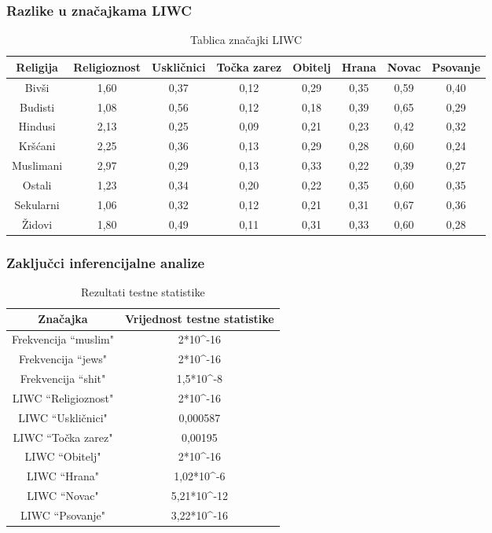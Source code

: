 \documentclass{beamer}
\begin{document}
\begin{frame}
\frametitle{Razlike u značajkama LIWC}
\begin{table}[h!]
\small
\setlength{\tabcolsep}{2pt}
\centering
\caption{Tablica značajki LIWC}
\label{table:liwc}
\begin{tabular}{@{}cccccccc@{}}
\hline
Religija  & Religioznost & Uskličnici & Točka zarez & Obitelj & Hrana & Novac & Psovanje \\
\hline
\hline
Bivši     & 1,60         & 0,37       & 0,12        & 0,29    & 0,35  & 0,59  & 0,40     \\
Budisti   & 1,08         & 0,56       & 0,12        & 0,18    & 0,39  & 0,65  & 0,29     \\
Hindusi   & 2,13         & 0,25       & 0,09        & 0,21    & 0,23  & 0,42  & 0,32     \\
Kršćani   & 2,25         & 0,36       & 0,13        & 0,29    & 0,28  & 0,60  & 0,24     \\
Muslimani & 2,97         & 0,29       & 0,13        & 0,33    & 0,22  & 0,39  & 0,27     \\
Ostali    & 1,23         & 0,34       & 0,20        & 0,22    & 0,35  & 0,60  & 0,35     \\
Sekularni & 1,06         & 0,32       & 0,12        & 0,21    & 0,31  & 0,67  & 0,36     \\
Židovi    & 1,80         & 0,49       & 0,11        & 0,31    & 0,33  & 0,60  & 0,28     \\

\hline
\end{tabular}
\end{table}
\end{frame}


\begin{frame}
\frametitle{Zaključci inferencijalne analize}
\begin{table}[h!]
\small
\centering
\caption{Rezultati testne statistike}
\label{table:inf}
\begin{tabular}{@{}cc@{}}
\hline
Značajka             & Vrijednost testne statistike   \\ 
\hline
\hline
Frekvencija ``muslim" & 2*10\textasciicircum{}-16    \\
Frekvencija ``jews"   & 2*10\textasciicircum{}-16    \\
Frekvencija ``shit"   & 1,5*10\textasciicircum{}-8   \\
LIWC ``Religioznost"  & 2*10\textasciicircum{}-16    \\
LIWC ``Uskličnici"    & 0,000587                     \\
LIWC ``Točka zarez"   & 0,00195                      \\
LIWC ``Obitelj"       & 2*10\textasciicircum{}-16    \\
LIWC ``Hrana"         & 1,02*10\textasciicircum{}-6  \\ 
LIWC ``Novac"         & 5,21*10\textasciicircum{}-12 \\
LIWC ``Psovanje"      & 3,22*10\textasciicircum{}-16 \\ 
\hline
\end{tabular}
\end{table}
\end{frame}
\end{document}

